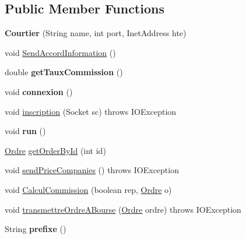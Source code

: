 \subsection*{Public Member Functions}
\begin{DoxyCompactItemize}
\item 
\mbox{\label{classcom_1_1m1sar_1_1_courtier_aace4acdb7a996a617f18e7073472db99}} 
{\bfseries Courtier} (String name, int port, Inet\+Address hte)
\item 
void \hyperlink{classcom_1_1m1sar_1_1_courtier_a1bb2f1869f4d4fc017df9a3b61d9cfae}{Send\+Accord\+Information} ()
\item 
\mbox{\label{classcom_1_1m1sar_1_1_courtier_a85d517053430a42fcb4898dd3be64f07}} 
double {\bfseries get\+Taux\+Commission} ()
\item 
\mbox{\label{classcom_1_1m1sar_1_1_courtier_a4811275c71f904d574382201c00cc1d4}} 
void {\bfseries connexion} ()
\item 
void \hyperlink{classcom_1_1m1sar_1_1_courtier_aef4506822d0bdcd2d66267a49efaf039}{inscription} (Socket sc)  throws I\+O\+Exception 
\item 
\mbox{\label{classcom_1_1m1sar_1_1_courtier_a06cf321542a1b26fb78714c692c4ebbb}} 
void {\bfseries run} ()
\item 
\hyperlink{classcom_1_1m1sar_1_1_ordre}{Ordre} \hyperlink{classcom_1_1m1sar_1_1_courtier_ac9e5e9ad51dbb22d38a67d7a859259a0}{get\+Order\+By\+Id} (int id)
\item 
void \hyperlink{classcom_1_1m1sar_1_1_courtier_a309ef9b76b3504683d0bf2cf8d634094}{send\+Price\+Companies} ()  throws I\+O\+Exception 
\item 
void \hyperlink{classcom_1_1m1sar_1_1_courtier_af614a260bc606940e06e3efee5771611}{Calcul\+Commission} (boolean rep, \hyperlink{classcom_1_1m1sar_1_1_ordre}{Ordre} o)
\item 
void \hyperlink{classcom_1_1m1sar_1_1_courtier_a54879f046ad25b89a1aed6f573fa1bf2}{transmettre\+Ordre\+A\+Bourse} (\hyperlink{classcom_1_1m1sar_1_1_ordre}{Ordre} ordre)  throws I\+O\+Exception 
\item 
\mbox{\label{classcom_1_1m1sar_1_1_courtier_aec0e3da5c60e31546a0532c524f5aee3}} 
String {\bfseries prefixe} ()
\end{DoxyCompactItemize}
